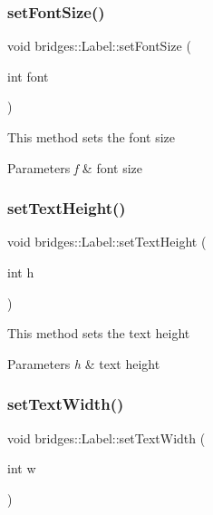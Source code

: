 \subsubsection{\texorpdfstring{setFontSize()}{setFontSize()}}
{\footnotesize\ttfamily void bridges\+::\+Label\+::set\+Font\+Size (\begin{DoxyParamCaption}\item[{int}]{font }\end{DoxyParamCaption})\hspace{0.3cm}{\ttfamily [inline]}}

This method sets the font size


\begin{DoxyParams}{Parameters}
{\em f} & font size \\
\hline
\end{DoxyParams}
\mbox{\label{classbridges_1_1_label_a0f12dc8d5530ae4c66e2be4974284d2b}} 
\subsubsection{\texorpdfstring{setTextHeight()}{setTextHeight()}}
{\footnotesize\ttfamily void bridges\+::\+Label\+::set\+Text\+Height (\begin{DoxyParamCaption}\item[{int}]{h }\end{DoxyParamCaption})\hspace{0.3cm}{\ttfamily [inline]}}

This method sets the text height


\begin{DoxyParams}{Parameters}
{\em h} & text height \\
\hline
\end{DoxyParams}
\mbox{\label{classbridges_1_1_label_ae7fc3629c3e1d18ceec6d96a9fa1f3a6}} 
\subsubsection{\texorpdfstring{setTextWidth()}{setTextWidth()}}
{\footnotesize\ttfamily void bridges\+::\+Label\+::set\+Text\+Width (\begin{DoxyParamCaption}\item[{int}]{w }\end{DoxyParamCaption})\hspace{0.3cm}{\ttfamily [inline]}}

